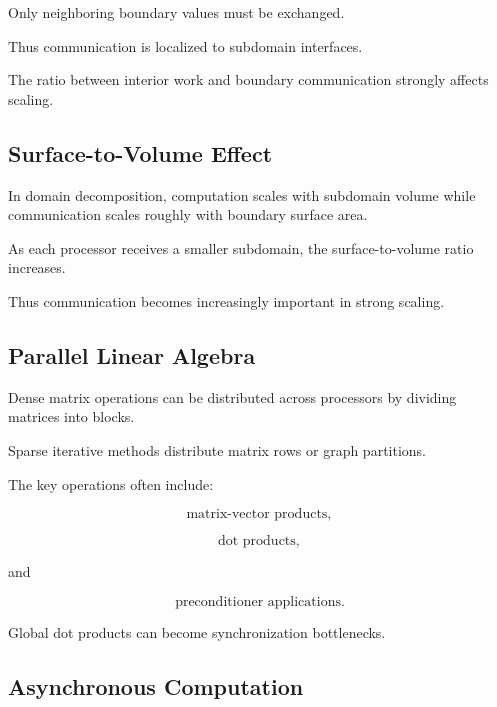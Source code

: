 Only neighboring boundary values must be exchanged.

Thus communication is localized to subdomain interfaces.

The ratio between interior work and boundary communication strongly affects
scaling.

\subsection{Surface-to-Volume Effect}
\label{subsec:surface-volume-effect}

In domain decomposition, computation scales with subdomain volume while
communication scales roughly with boundary surface area.

As each processor receives a smaller subdomain, the surface-to-volume ratio
increases.

Thus communication becomes increasingly important in strong scaling.

\subsection{Parallel Linear Algebra}
\label{subsec:parallel-linear-algebra}

Dense matrix operations can be distributed across processors by dividing
matrices into blocks.

Sparse iterative methods distribute matrix rows or graph partitions.

The key operations often include:

\[
\boxed{
\text{matrix-vector products},
}
\]

\[
\boxed{
\text{dot products},
}
\]

and

\[
\boxed{
\text{preconditioner applications}.
}
\]

Global dot products can become synchronization bottlenecks.

\subsection{Asynchronous Computation}
\label{subsec:asynchronous-computation}

